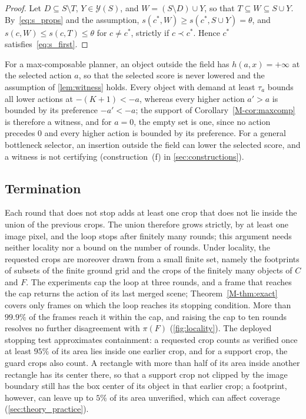 \documentclass[10pt,letterpaper]{article}
\newcommand{\draft}{C}
\newcommand{\full}{F}
\newcommand{\policy}{\pi}
\theoremstyle{remark}
\theoremstyle{plain}
\theoremstyle{definition}
\newcommand{\mrefnum}[1]{\ref*{M-#1}}
\begin{document}
\begin{proof}
Let $D\subseteq S\setminus T$, $Y\in\mathcal{Y}(S)$, and $W=(S\setminus D)\cup Y$, so that $T\subseteq W\subseteq S\cup Y$.
By~\cref{eq:s_props} and the assumption, $s(c^\ast,W)\ge s(c^\ast,S\cup Y)=\theta$, and $s(c,W)\le s(c,T)\le\theta$ for $c\neq c^\ast$, strictly if $c\prec c^\ast$.
Hence $c^\ast$ satisfies~\cref{eq:s_first}.
\end{proof}

For a max-composable planner, an object outside the field has $h(a,x)=+\infty$ at the selected action $a$, so that the selected score is never lowered and the assumption of \cref{lem:witness} holds.
Every object with demand at least $\tau_a$ bounds all lower actions at $-(K{+}1)<-a$, whereas every higher action $a'>a$ is bounded by its preference $-a'<-a$; the support of Corollary~\mrefnum{cor:maxcomp} is therefore a witness, and for $a=0$, the empty set is one, since no action precedes $0$ and every higher action is bounded by its preference.
For a general bottleneck selector, an insertion outside the field can lower the selected score, and a witness is not certifying (construction~(f) in \cref{sec:constructions}).

\subsection{Termination}
\label{sec:termination}

Each round that does not stop adds at least one crop that does not lie inside the union of the previous crops. The union therefore grows strictly, by at least one image pixel, and the loop stops after finitely many rounds; this argument needs neither locality nor a bound on the number of rounds.
Under locality, the requested crops are moreover drawn from a small finite set, namely the footprints of subsets of the finite ground grid and the crops of the finitely many objects of $\draft$ and $\full$.
The experiments cap the loop at three rounds, and a frame that reaches the cap returns the action of its last merged scene; Theorem~\mrefnum{thm:exact} covers only frames on which the loop reaches its stopping condition.
More than $99.9\%$ of the frames reach it within the cap, and raising the cap to ten rounds resolves no further disagreement with $\policy(\full)$ (\cref{fig:locality}).
The deployed stopping test approximates containment: a requested crop counts as verified once at least $95\%$ of its area lies inside one earlier crop, and for a support crop, the guard crops also count. A rectangle with more than half of its area inside another rectangle has its center there, so that a support crop not clipped by the image boundary still has the box center of its object in that earlier crop; a footprint, however, can leave up to $5\%$ of its area unverified, which can affect coverage (\cref{sec:theory_practice}).
\end{document}
